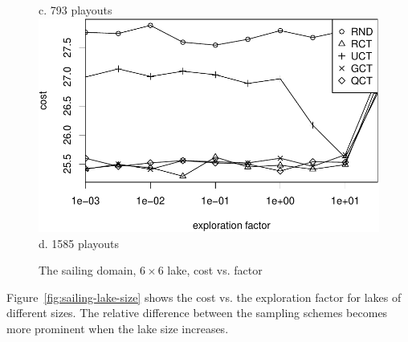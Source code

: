 \documentclass{article}
\begin{document}
\begin{figure}[ht]
\begin{minipage}[b]{0.5\linewidth}
    c. 793 playouts\\
    \vspace{1em}
    \includegraphics[scale=0.45]{costs-size=6-nsamples=1585.pdf}\\
    d. 1585 playouts\\
  \end{minipage}
  \caption{The sailing domain, $6\times 6$ lake, cost vs. factor}
  \label{fig:sailing-cost-vs-factor}
\end{figure}


Figure~\ref{fig:sailing-lake-size} shows the cost vs. the exploration
factor for lakes of different sizes. The relative difference between
the sampling schemes becomes more prominent when the lake size
increases.
\end{document}

